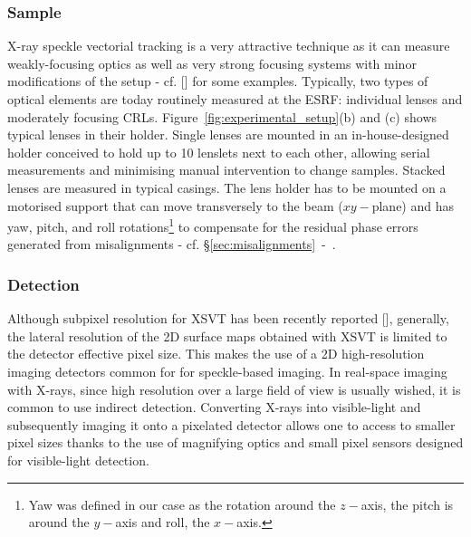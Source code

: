 \begin{refsection}
\subsubsection*{Sample}

X-ray speckle vectorial tracking is a very attractive technique as it can measure weakly-focusing optics as well as very strong focusing systems with minor modifications of the setup - cf. [\cite{Berujon2020a}] for some examples. Typically, two types of optical elements are today routinely measured at the ESRF: individual lenses and moderately focusing CRLs. Figure~\ref{fig:experimental_setup}(b) and (c) shows typical lenses in their holder. Single lenses are mounted in an in-house-designed holder conceived to hold up to 10 lenslets next to each other, allowing serial measurements and minimising manual intervention to change samples. Stacked lenses are measured in typical casings. The lens holder has to be mounted on a motorised support that can move transversely to the beam ($xy-$plane) and has yaw, pitch, and roll rotations\footnote{Yaw was defined in our case as the rotation around the $z-$axis, the pitch is around the $y-$axis and roll, the $x-$axis.} to compensate for the residual phase errors generated from misalignments - cf. \S\ref{sec:misalignments}~-~\textit{}. 

\subsubsection*{Detection}

Although subpixel resolution for XSVT has been recently reported [\cite{Qiao2020b}], generally, the lateral resolution of the 2D surface maps obtained with XSVT is limited to the detector effective pixel size. This makes the use of a 2D high-resolution imaging detectors common for for speckle-based imaging. In real-space imaging with X-rays, since high resolution over a large field of view is usually wished, it is common to use indirect detection. Converting X-rays into visible-light and subsequently imaging it onto a pixelated detector allows one to access to smaller pixel sizes thanks to the use of magnifying optics and small pixel sensors designed for visible-light detection.


\end{refsection}
